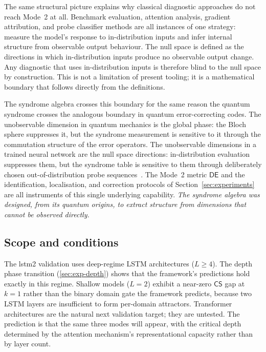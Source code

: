 \documentclass[11pt,a4paper]{article}
\newcommand{\CS}{\mathsf{CS}}
\newcommand{\DE}{\mathsf{DE}}
\begin{document}
The same structural picture explains why classical diagnostic approaches do not reach Mode~2 at all. Benchmark evaluation, attention analysis, gradient attribution, and probe classifier methods are all instances of one strategy: measure the model's response to in-distribution inputs and infer internal structure from observable output behaviour. The null space is defined as the directions in which in-distribution inputs produce no observable output change. Any diagnostic that uses in-distribution inputs is therefore blind to the null space by construction. This is not a limitation of present tooling; it is a mathematical boundary that follows directly from the definitions.
 
The syndrome algebra crosses this boundary for the same reason the quantum syndrome crosses the analogous boundary in quantum error-correcting codes. The unobservable dimension in quantum mechanics is the global phase: the Bloch sphere suppresses it, but the syndrome measurement is sensitive to it through the commutation structure of the error operators. The unobservable dimensions in a trained neural network are the null space directions: in-distribution evaluation suppresses them, but the syndrome table is sensitive to them through deliberately chosen out-of-distribution probe sequences~\cite{SyndromeAlgebra}. The Mode~2 metric $\DE$ and the identification, localisation, and correction protocols of Section~\ref{sec:experiments} are all instruments of this single underlying capability. \emph{The syndrome algebra was designed, from its quantum origins, to extract structure from dimensions that cannot be observed directly.}

\subsection{Scope and conditions}
\label{sec:disc-scope}

The lstm2 validation uses deep-regime LSTM architectures ($L \geq 4$). The depth phase transition (\ref{sec:exp-depth}) shows that the framework's predictions hold exactly in this regime. Shallow models ($L = 2$) exhibit a near-zero $\CS$ gap at $k = 1$ rather than the binary domain gate the framework predicts, because two LSTM layers are insufficient to form per-domain attractors. Transformer architectures are the natural next validation target; they are untested. The prediction is that the same three modes will appear, with the critical depth determined by the attention mechanism's representational capacity rather than by layer count.
\end{document}
